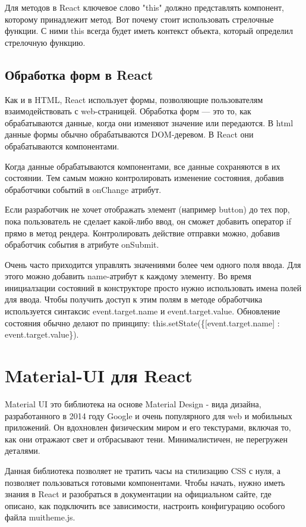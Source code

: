\documentclass[14pt, a4paper]{diplom}
\begin{document}
Для методов в React ключевое слово "this" должно представлять компонент, которому принадлежит метод.
Вот почему стоит использовать стрелочные функции. С ними this всегда будет иметь контекст объекта, который определил стрелочную функцию.

\subsection{Обработка форм в React}

Как и в HTML, React использует формы, позволяющие пользователям взаимодействовать с web-страницей.
Обработка форм — это то, как обрабатываются данные, когда они изменяют значение или передаются.
В html данные формы обычно обрабатываются DOM-деревом. В React они обрабатываются компонентами.

Когда данные обрабатываются компонентами, все данные сохраняются в их состоянии.
Тем самым можно контролировать изменение состояния, добавив обработчики событий в onChange атрибут.

Если разработчик не хочет отображать элемент (например button) до тех пор, пока пользователь не сделает какой-либо ввод, он сможет добавить оператор if прямо в метод рендера.
Контролировать действие отправки можно, добавив обработчик события в атрибуте onSubmit.

Очень часто приходится управлять значениями более чем одного поля ввода. Для этого можно добавить name-атрибут к каждому элементу.
Во время инициалзации состояний в конструкторе просто нужно использовать имена полей для ввода.
Чтобы получить доступ к этим полям в методе обработчика используется синтаксис event.target.name и event.target.value.
Обновление состояния обычно делают по принципу: this.setState(\{[event.target.name] : event.target.value\}).

\section{Material-UI для React}

Material UI это библиотека на основе Material Design - вида дизайна, разработанного в 2014 году Google и очень популярного для web и мобильных приложений.
Он вдохновлен физическим миром и его текстурами, включая то, как они отражают свет и отбрасывают тени. Минималистичен, не перегружен деталями.

Данная библиотека позволяет не тратить часы на стилизацию CSS с нуля, а позволяет пользоваться готовыми компонентами. Чтобы начать, нужно иметь знания в React и разобраться в документации на официальном сайте,
где описано, как подключить все зависимости, настроить конфигурацию особого файла muitheme.js. 
\end{document}
